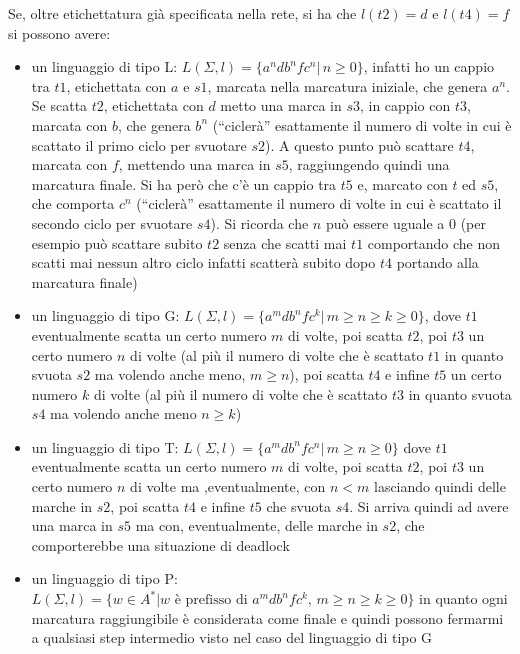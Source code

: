 \documentclass[a4paper,12pt, oneside]{book}
\begin{document}
\begin{esempio}
  Se, oltre etichettatura già specificata nella rete, si ha che $l(t2)=d$ e
  $l(t4)=f$ si possono avere: 
  \begin{itemize}    
    \item un linguaggio di tipo L: $L(\Sigma,l)=\{a^ndb^nfc^n|\,n\geq 0\}$,
    infatti ho un cappio tra $t1$, etichettata con $a$ e $s1$, marcata nella
    marcatura iniziale, che genera $a^n$. Se scatta $t2$, etichettata con $d$
    metto una marca in $s3$, in cappio con $t3$, marcata con $b$, che genera
    $b^n$ (``ciclerà'' esattamente il numero di volte in cui è scattato il primo
    ciclo per svuotare $s2$). A questo punto può scattare $t4$, marcata con $f$,
    mettendo una marca in $s5$, raggiungendo quindi una marcatura finale. Si ha
    però che c'è un cappio tra $t5$ e, marcato con $t$ ed $s5$, che comporta $c^n$
    (``ciclerà'' esattamente il numero di volte in cui è scattato il secondo 
    ciclo per svuotare $s4$). Si ricorda che
    $n$ può essere uguale a 0 (per esempio può scattare subito $t2$ senza che
    scatti mai $t1$ comportando che non scatti mai nessun altro ciclo infatti
    scatterà subito dopo $t4$ portando alla marcatura finale)
    \item un linguaggio di tipo G: $L(\Sigma,l)=\{a^mdb^nfc^k|\,m\geq n\geq
    k\geq 0\}$, dove $t1$ eventualmente scatta un certo numero $m$ di volte, poi
    scatta $t2$, poi $t3$ un certo numero $n$ di volte (al più il numero di volte
    che è scattato $t1$ in quanto svuota $s2$ ma volendo anche meno, $m\geq n$),
    poi scatta $t4$ e infine $t5$ un certo numero $k$ di volte (al più il numero
    di volte che è scattato $t3$ in quanto svuota $s4$ ma volendo anche meno
    $n\geq k$)
    \item un linguaggio di tipo T: $L(\Sigma,l)=\{a^mdb^nfc^n|\,m\geq n\geq 0\}$
    dove $t1$ eventualmente scatta un certo numero $m$ di volte, poi
    scatta $t2$, poi $t3$ un certo numero $n$ di volte ma ,eventualmente, con
    $n<m$ lasciando quindi delle marche in $s2$, poi scatta $t4$ e infine $t5$ che
    svuota $s4$. Si  arriva quindi ad avere una marca in $s5$ ma con,
    eventualmente, delle marche in $s2$, che comporterebbe una situazione di
    deadlock 
    \item un linguaggio di tipo P: \\
    $L(\Sigma,l)=\{w\in A^*| w\mbox{ è prefisso di } a^mdb^nfc^k,\,m\geq n\geq
    k\geq 0\}$ in quanto ogni marcatura raggiungibile è considerata come finale
    e quindi possono fermarmi a qualsiasi step intermedio visto nel caso del
    linguaggio di tipo G

\end{itemize}
\end{esempio}
\end{document}
